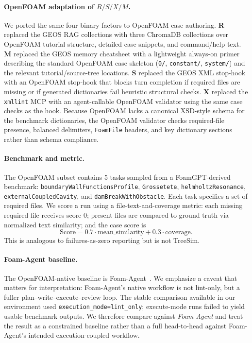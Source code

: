 \documentclass{article}
\begin{document}
\paragraph{OpenFOAM adaptation of \texorpdfstring{$R/S/X/M$}{R/S/X/M}.}
We ported the same four binary factors to OpenFOAM case authoring. \textbf{R} replaced the GEOS RAG collections with three ChromaDB collections over OpenFOAM tutorial structure, detailed case snippets, and command/help text. \textbf{M} replaced the GEOS memory cheatsheet with a lightweight always-on primer describing the standard OpenFOAM case skeleton (\texttt{0/}, \texttt{constant/}, \texttt{system/}) and the relevant tutorial/source-tree locations. \textbf{S} replaced the GEOS XML stop-hook with an OpenFOAM stop-hook that blocks turn completion if required files are missing or if generated dictionaries fail heuristic structural checks. \textbf{X} replaced the \texttt{xmllint} MCP with an agent-callable OpenFOAM validator using the same case checks as the hook. Because OpenFOAM lacks a canonical XSD-style schema for the benchmark dictionaries, the OpenFOAM validator checks required-file presence, balanced delimiters, \texttt{FoamFile} headers, and key dictionary sections rather than schema compliance.

\paragraph{Benchmark and metric.}
The OpenFOAM subset contains 5 tasks sampled from a FoamGPT-derived benchmark: \texttt{boundaryWallFunctionsProfile}, \texttt{Grossetete}, \texttt{helmholtzResonance}, \texttt{externalCoupledCavity}, and \texttt{damBreakWithObstacle}. Each task specifies a set of required files. We score a run using a file-text-and-coverage metric: each missing required file receives score 0; present files are compared to ground truth via normalized text similarity; and the case score is
\[
\mathrm{Score} = 0.7 \cdot \mathrm{mean\_similarity} + 0.3 \cdot \mathrm{coverage}.
\]
This is analogous to failures-as-zero reporting but is not TreeSim.

\paragraph{Foam-Agent baseline.}
The OpenFOAM-native baseline is Foam-Agent~\citep{foamagent2025}. We emphasize a caveat that matters for interpretation: Foam-Agent's native workflow is not lint-only, but a fuller plan--write--execute--review loop. The stable comparison available in our environment used \texttt{execution\_mode=lint\_only}; execute-mode runs failed to yield usable benchmark outputs. We therefore compare against \emph{Foam-Agent} and treat the result as a constrained baseline rather than a full head-to-head against Foam-Agent's intended execution-coupled workflow.
\end{document}
